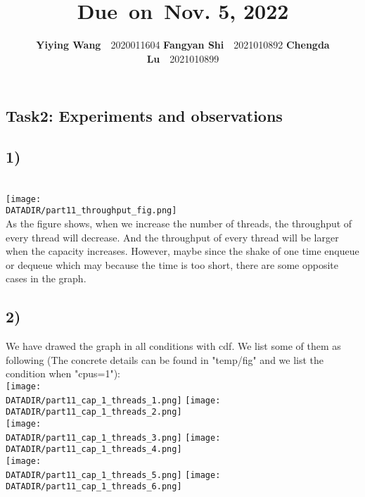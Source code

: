 \documentclass{article}
\title{\textmd{\bf \Class}\\\normalsize\vspace{0.1in}\small{Due\ on\ Nov. 5, 2022}}
\date{}
\author{\textbf{Yiying Wang}\ \ 2020011604 \textbf{Fangyan Shi}\ \ 2021010892  \textbf{Chengda Lu}\ \ 2021010899}
\newcommand{\DATADIR}{} %
\begin{document}
\begin{spacing}{1.1}
\maketitle \thispagestyle{empty}
\section*{Task2: Experiments and observations}
\subsection*{1)}
\\\texttt{[image: \\DATADIR/part11\_throughput\_fig.png]}
\\\indent As the figure shows, when we increase the number of threads, the throughput of every thread will decrease. And the throughput of every thread  will be larger when the capacity increases. However, maybe since the shake of one time enqueue or dequeue which may because the time is too short, there are some opposite cases in the graph.

\subsection*{2)}
\indent We have drawed the graph in all conditions with cdf. We list some of them as following (The concrete details can be found in "temp/fig" and we list the condition when "cpus=1"):
\\\texttt{[image: \\DATADIR/part11\_cap\_1\_threads\_1.png]}
\texttt{[image: \\DATADIR/part11\_cap\_1\_threads\_2.png]}
\newpage
\\\texttt{[image: \\DATADIR/part11\_cap\_1\_threads\_3.png]}
\texttt{[image: \\DATADIR/part11\_cap\_1\_threads\_4.png]}
\\\texttt{[image: \\DATADIR/part11\_cap\_1\_threads\_5.png]}
\texttt{[image: \\DATADIR/part11\_cap\_1\_threads\_6.png]}


\end{spacing}
\end{document}
